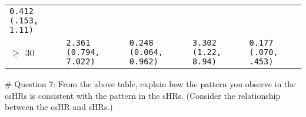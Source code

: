 \documentclass[]{article}
\begin{document}
\begin{longtable}[]{@{}lllll@{}}
\begin{minipage}[t]{0.23\columnwidth}
\tt{0.412} (.153, 1.11)\strut
\end{minipage}\tabularnewline
\begin{minipage}[t]{0.09\columnwidth}\raggedright\strut
\(\ge\) 30\strut
\end{minipage} & \begin{minipage}[t]{0.16\columnwidth}\raggedright\strut
\tt{2.361} (\tt{0.794}, \tt{7.022})\strut
\end{minipage} & \begin{minipage}[t]{0.16\columnwidth}\raggedright\strut
\tt{0.248} (\tt{0.064}, \tt{0.962})\strut
\end{minipage} & \begin{minipage}[t]{0.23\columnwidth}\raggedright\strut
\tt{3.302} (1.22, 8.94)\strut
\end{minipage} & \begin{minipage}[t]{0.23\columnwidth}\raggedright\strut
\tt{0.177} (.070, .453)\strut
\end{minipage}\tabularnewline
\bottomrule
\end{longtable}

\vspace{12pt} \# Question 7: From the above table, explain how the
pattern you observe in the csHRs is consistent with the pattern in the
sHRs. (Consider the relationship between the csHR and sHRs.)
\end{document}
